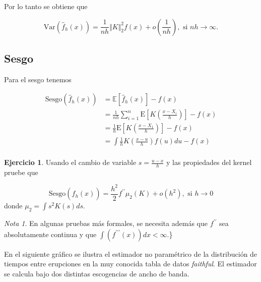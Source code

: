 \documentclass[
  12pt,
]{book}
\theoremstyle{definition}
\theoremstyle{definition}
\theoremstyle{definition}
\newtheorem{exercise}{Ejercicio}[chapter]
\theoremstyle{definition}
\theoremstyle{remark}
\newtheorem*{remark}{Nota}
\begin{document}
Por lo tanto se obtiene que

\begin{equation*}
\mathrm{Var}\left(\hat{f}_{h}(x)\right) = \frac{1}{nh} \Vert K\Vert_{2}^{2}f(x) + o\left(\frac{1}{nh}\right), \text{ si } nh\to \infty.
\end{equation*}

\hypertarget{sesgo-1}{%
\subsection{Sesgo}\label{sesgo-1}}

Para el sesgo tenemos

\begin{align*}
\mathrm{Sesgo}\left(\hat{f}_{h}(x)\right)
& = \mathbb{E}\left[\hat{f}_{h}(x)\right]-f(x)                                                  \\
& = \frac{1}{nh} \sum_{i=1}^{n} \mathrm{E}\left[K\left( \frac{x-X_{i}}{h} \right)\right] - f(x) \\
& = \frac{1}{h}\mathrm{E}\left[K\left( \frac{x-X_{1}}{h} \right)\right] - f(x)                  \\
& = \int \frac{1}{h} K\left( \frac{x-u}{h}\right)f(u)du -f(x)                                   \\
\end{align*}

\begin{exercise}
\protect\hypertarget{exr:unnamed-chunk-25}{}\label{exr:unnamed-chunk-25}Usando el cambio de variable \(s=\frac{u-x}{h}\) y las propiedades del kernel pruebe que

\begin{equation*}
\mathrm{Sesgo}\left(\hat{f}_{h}(x)\right) = \frac{h^{2}}{2} f^{\prime\prime} \mu_{2}(K) + o(h^{2}), \text{ si } h\to 0
\end{equation*}
donde \(\mu_{2}=\int s^{2}K(s)ds\).
\end{exercise}

\begin{remark}
En algunas pruebas más formales, se necesita además que \(f^{\prime\prime}\) sea absolutamente continua y que \(\int(f^{\prime\prime\prime}(x))dx<\infty\).\}
\end{remark}

En el siguiente gráfico se ilustra el estimador no paramétrico de la distribución de tiempos entre erupciones en la muy conocida tabla de datos \emph{faithful}. El estimador se calcula bajo dos distintas escogencias de ancho de banda.
\end{document}
